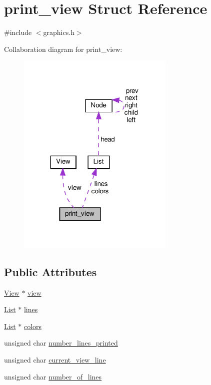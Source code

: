 \hypertarget{structprint__view}{}\section{print\+\_\+view Struct Reference}
\label{structprint__view}


{\ttfamily \#include $<$graphics.\+h$>$}



Collaboration diagram for print\+\_\+view\+:
\nopagebreak
\begin{figure}[H]
\begin{center}
\leavevmode
\includegraphics[width=212pt]{structprint__view__coll__graph}
\end{center}
\end{figure}
\subsection*{Public Attributes}
\begin{DoxyCompactItemize}
\item 
\hyperlink{structView}{View} $\ast$ \hyperlink{structprint__view_a189a4274f84ccdacb6210281d0163c7a}{view}
\item 
\hyperlink{structList}{List} $\ast$ \hyperlink{structprint__view_af78b98b8b676db7c0bf077cf1ac9aebb}{lines}
\item 
\hyperlink{structList}{List} $\ast$ \hyperlink{structprint__view_a58588dfd2ef043a6f042f10a295064e7}{colors}
\item 
unsigned char \hyperlink{structprint__view_a3a02430bd34dc873fc1cc61f7834d20e}{number\+\_\+lines\+\_\+printed}
\item 
unsigned char \hyperlink{structprint__view_ad5678744072375331613d2775773c933}{current\+\_\+view\+\_\+line}
\item 
unsigned char \hyperlink{structprint__view_a8f1ab6ae1c7d65a6535ce9cc3fa128b1}{number\+\_\+of\+\_\+lines}
\end{DoxyCompactItemize}


